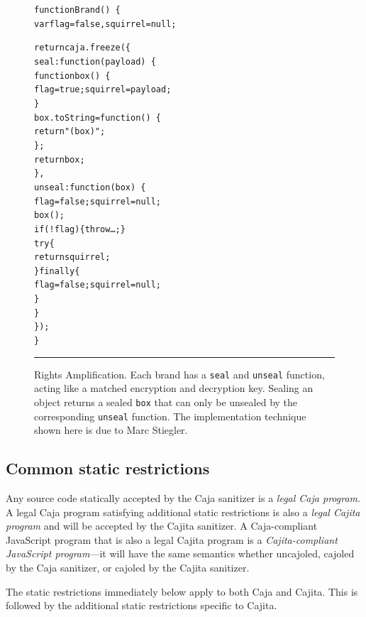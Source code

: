 \documentclass[letterpaper,twocolumn,10pt]{article}
\newcommand{\code}[1]{{\tt {#1}}}              %
\begin{document}
\begin{figure}[t!]
\begin{alltt}
function Brand()\ \{
  var flag = false, squirrel = null;

  return caja.freeze(\{
    seal: function(payload)\ \{
      function box()\ \{
        flag = true; squirrel = payload;
      \}
      box.toString = function()\ \{
        return "(box)";
      \};
      return box;
    \},
    unseal: function(box)\ \{
      flag = false; squirrel = null;
      box();
      if (!flag) \{ throw {\ldots}; \}
      try \{
        return squirrel;
      \} finally \{
        flag = false; squirrel = null;
      \}
    \}
  \});
\}
\end{alltt}

\caption[Rights Amplification]{Rights Amplification. Each brand has a 
\code{seal} and \code{unseal} function, acting like a matched encryption and 
decryption key. Sealing an object returns a sealed \code{box} that can only 
be unsealed by the corresponding \code{unseal} function. The implementation 
technique shown here is due to Marc Stiegler.
\\ } \hrule
\label{fig:rights-amp}
\end{figure}



\subsection{Common static restrictions}
\label{subsec:common-static}

Any source code statically accepted by the Caja sanitizer is a \emph{legal 
Caja program}. A legal Caja program satisfying additional static restrictions 
is also a \emph{legal Cajita program} and will be accepted by the Cajita 
sanitizer. A Caja-compliant JavaScript program that is also a legal Cajita 
program is a \emph{Cajita-compliant JavaScript program}---it will have the 
same semantics whether uncajoled, cajoled by the Caja sanitizer, or cajoled 
by the Cajita sanitizer.

The static restrictions immediately below apply to both Caja and Cajita. This 
is followed by the additional static restrictions specific to Cajita.
\end{document}
